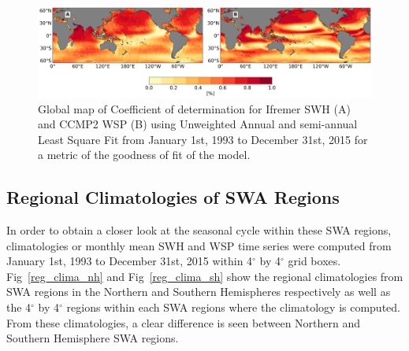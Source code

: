 \documentclass[12pt,twoside]{article}
\begin{document}
\begin{figure}[tbh]
\centering
\includegraphics[width=1.0\textwidth]{figs/lsf_parameters/ccmp2_ifremer_goodness_of_fit_5_par.png}
\caption{Global map of Coefficient of determination for Ifremer SWH (A) and CCMP2 WSP (B) using Unweighted Annual and semi-annual Least Square Fit from January 1st, 1993 to December 31st, 2015 for a metric of the goodness of fit of the model.}
\label{Ifremer_ccmp2_lsf_gof}
\end{figure}

\subsection{Regional Climatologies of SWA Regions}

In order to obtain a closer look at the seasonal cycle within these SWA regions, climatologies or monthly mean SWH and WSP time series were computed from January 1st, 1993 to December 31st, 2015 within 4$^{\circ}$ by 4$^{\circ}$ grid boxes. Fig~\ref{reg_clima_nh} and Fig~\ref{reg_clima_sh} show the regional climatologies from SWA regions in the Northern and Southern Hemispheres respectively as well as the 4$^{\circ}$ by 4$^{\circ}$ regions within each SWA regions where the climatology is computed. From these climatologies, a clear difference is seen between Northern and Southern Hemisphere SWA regions. 
\end{document}
